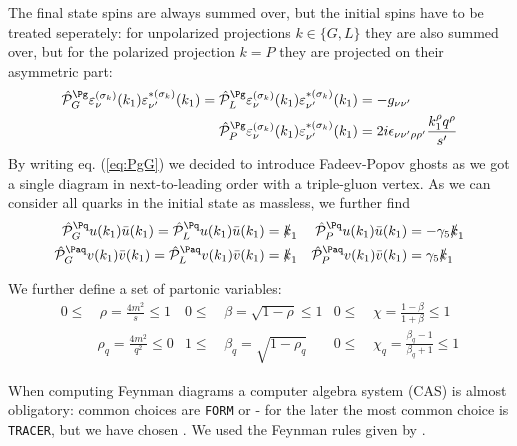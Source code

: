The final state spins are always summed over, but the initial spins have to be treated seperately: for unpolarized projections $k\in\{G,L\}$ they are also summed over, but for the polarized projection $k=P$ they are projected on their asymmetric part:
\begin{align}
\hat {\mathcal P}^{\Pg}_{G}\varepsilon^{(\sigma_k)}_\nu(k_1)\varepsilon^{*(\sigma_k)}_{\nu'}(k_1) = \hat {\mathcal P}^{\Pg}_{L}\varepsilon^{(\sigma_k)}_\nu(k_1)\varepsilon^{*(\sigma_k)}_{\nu'}(k_1) &= -g_{\nu\nu'} \label{eq:PgG} \\
\hat {\mathcal P}^{\Pg}_{P}\varepsilon^{(\sigma_k)}_\nu(k_1)\varepsilon^{*(\sigma_k)}_{\nu'}(k_1) &= 2i\epsilon_{\nu\nu'\rho\rho'}\frac{k_1^{\rho}q^{\rho}}{s'}
\end{align}
By writing eq. (\ref{eq:PgG}) we decided to introduce Fadeev-Popov ghosts\cite{Bojak:2000eu} as we got a single diagram in next-to-leading order with a triple-gluon vertex. As we can consider all quarks in the initial state as massless, we further find
\begin{align}
\hat {\mathcal P}^{\Pq}_{G} u(k_1)\bar u(k_1) = \hat {\mathcal P}^{\Pq}_{L} u(k_1)\bar u(k_1) &= \slashed k_1
&\hat {\mathcal P}^{\Pq}_{P} u(k_1)\bar u(k_1) &= -\gamma_5\slashed k_1\\
\hat {\mathcal P}^{\Paq}_{G} v(k_1)\bar v(k_1) = \hat {\mathcal P}^{\Paq}_{L} v(k_1)\bar v(k_1) &= \slashed k_1
&\hat {\mathcal P}^{\Paq}_{P} v(k_1)\bar v(k_1) &= \gamma_5\slashed k_1
\end{align}

We further define a set of partonic variables:
\begin{align}
0\leq&\,\rho = \frac {4m^2} s\leq 1 &0\leq&\,\beta = \sqrt{1-\rho}\leq 1 &0\leq&\,\chi = \frac{1-\beta}{1+\beta}\leq 1\\
&\rho_q = \frac {4m^2} {q^2}\leq 0 &1\leq&\,\beta_q = \sqrt{1-\rho_q} &0\leq&\,\chi_q = \frac{\beta_q-1}{\beta_q+1}\leq 1
\end{align}

When computing Feynman diagrams a computer algebra system (CAS) is almost obligatory: common choices are \texttt{FORM}\cite{Vermaseren:2000nd} or \MMa\cite{Mathematica} - for the later the most common choice is \texttt{TRACER}\cite{Tracer}, but we have chosen \HEPMath\cite{wiebusch_hepmath_2015}. We used the Feynman rules given by \cite{Leader}.
